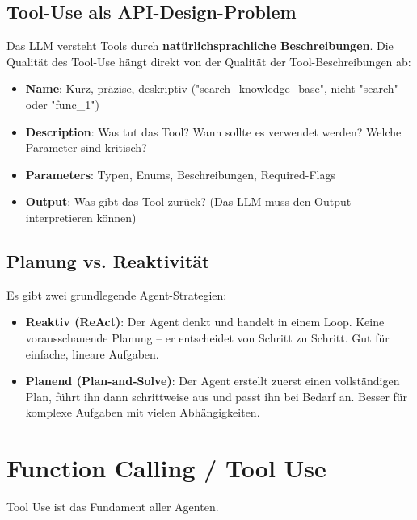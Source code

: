 \subsection{Tool-Use als API-Design-Problem}

Das LLM versteht Tools durch \textbf{natürlichsprachliche Beschreibungen}. Die Qualität des Tool-Use hängt direkt von der Qualität der Tool-Beschreibungen ab:

\begin{itemize}[leftmargin=*]
    \item \textbf{Name}: Kurz, präzise, deskriptiv ("search\_knowledge\_base", nicht "search" oder "func\_1")
    \item \textbf{Description}: Was tut das Tool? Wann sollte es verwendet werden? Welche Parameter sind kritisch?
    \item \textbf{Parameters}: Typen, Enums, Beschreibungen, Required-Flags
    \item \textbf{Output}: Was gibt das Tool zurück? (Das LLM muss den Output interpretieren können)
\end{itemize}

\subsection{Planung vs. Reaktivität}

Es gibt zwei grundlegende Agent-Strategien:

\begin{itemize}[leftmargin=*]
    \item \textbf{Reaktiv (ReAct)}: Der Agent denkt und handelt in einem Loop. Keine vorausschauende Planung -- er entscheidet von Schritt zu Schritt. Gut für einfache, lineare Aufgaben.
    \item \textbf{Planend (Plan-and-Solve)}: Der Agent erstellt zuerst einen vollständigen Plan, führt ihn dann schrittweise aus und passt ihn bei Bedarf an. Besser für komplexe Aufgaben mit vielen Abhängigkeiten.
\end{itemize}

\section{Function Calling / Tool Use}

Tool Use ist das Fundament aller Agenten.

